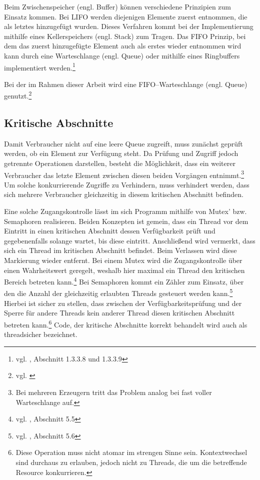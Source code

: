 Beim Zwischenspeicher (engl. Buffer) können verschiedene Prinzipien zum Einsatz kommen. Bei \ac{LIFO} werden diejenigen Elemente zuerst entnommen, die als letztes hinzugefügt wurden. Dieses Verfahren kommt bei der Implementierung mithilfe eines Kellerspeichers (engl. Stack) zum Tragen.  Das \ac{FIFO} Prinzip, bei dem das zuerst hinzugefügte Element auch als erstes wieder entnommen wird kann durch eine Warteschlange (engl. Queue) oder mithilfe eines Ringbuffers implementiert werden.\footnote{vgl. \cite{algorithms}, Abschnitt 1.3.3.8 und 1.3.3.9}

Bei der im Rahmen dieser Arbeit wird eine FIFO–Warteschlange (engl. Queue) genutzt.\footnote{vgl. \cite{javadoc:lbq}}


\subsection{Kritische Abschnitte} %
\label{sub:kritische_abschnitte}

Damit Verbraucher nicht auf eine leere Queue zugreift, muss zunächst geprüft werden, ob ein Element zur Verfügung steht. Da Prüfung und Zugriff jedoch getrennte Operationen darstellen, besteht die Möglichkeit, dass ein weiterer Verbraucher das letzte Element zwischen diesen beiden Vorgängen entnimmt.\footnote{Bei mehreren Erzeugern tritt das Problem analog bei fast voller Warteschlange auf.} Um solche konkurrierende Zugriffe zu Verhindern, muss verhindert werden, dass sich mehrere Verbraucher gleichzeitig in diesem kritischen Abschnitt befinden.

Eine solche Zugangskontrolle lässt im sich Programm mithilfe von Mutex' bzw. Semaphoren realisieren. Beiden Konzepten ist gemein, dass ein Thread vor dem Eintritt in einen kritischen Abschnitt dessen Verfügbarkeit prüft und gegebenenfalls solange wartet, bis diese eintritt. Anschließend wird vermerkt, dass sich ein Thread im kritischen Abschnitt befindet. Beim Verlassen wird diese Markierung wieder entfernt. Bei einem Mutex wird die Zugangskontrolle über einen Wahrheitswert geregelt, weshalb hier maximal ein Thread den kritischen Bereich betreten kann.\footnote{vgl. \cite{oscon}, Abschnitt 5.5} Bei Semaphoren kommt ein Zähler zum Einsatz, über den die Anzahl der gleichzeitig erlaubten Threads gesteuert werden kann.\footnote{vgl. \cite{oscon}, Abschnitt 5.6} Hierbei ist sicher zu stellen, dass zwischen der Verfügbarkeitsprüfung und der Sperre für andere Threads kein anderer Thread diesen kritischen Abschnitt betreten kann.\footnote{Diese Operation muss nicht atomar im strengen Sinne sein. Kontextwechsel sind durchaus zu erlauben, jedoch nicht zu Threads, die um die betreffende Resource konkurrieren.} Code, der kritische Abschnitte korrekt behandelt wird auch als threadsicher bezeichnet.

